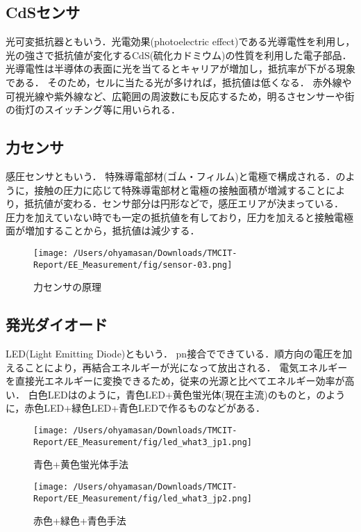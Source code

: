 \subsection{CdSセンサ\cite{dsfase}\cite{8347ty34i}\cite{B056}\cite{R300000001-I023994699-00}}
\label{CDSG}
光可変抵抗器ともいう．光電効果(photoelectric effect)である光導電性を利用し，光の強さで抵抗値が変化するCdS(硫化カドミウム)の性質を利用した電子部品．
光導電性は半導体の表面に光を当てるとキャリアが増加し，抵抗率が下がる現象である．
そのため，セルに当たる光が多ければ，抵抗値は低くなる．
赤外線や可視光線や紫外線など、広範囲の周波数にも反応するため，明るさセンサーや街の街灯のスイッチング等に用いられる．

\subsection{力センサ\cite{asdfsa}\cite{canon}}
\label{PG}
感圧センサともいう．
特殊導電部材(ゴム・フィルム)と電極で構成される．のように，接触の圧力に応じて特殊導電部材と電極の接触面積が増減することにより，抵抗値が変わる．センサ部分は円形などで，感圧エリアが決まっている．
圧力を加えていない時でも一定の抵抗値を有しており，圧力を加えると接触電極面が増加することから，抵抗値は減少する．

\begin{figure}[h]
\centering
\texttt{[image: /Users/ohyamasan/Downloads/TMCIT-Report/EE\_Measurement/fig/sensor-03.png]}
\caption{力センサの原理}
\label{fig:weight}
\end{figure}

\subsection{発光ダイオード\cite{dafadsav}\cite{gjkdgfbn}}
\label{LEDG}
LED(Light Emitting Diode)ともいう．
pn接合でできている．順方向の電圧を加えることにより，再結合エネルギーが光になって放出される．
電気エネルギーを直接光エネルギーに変換できるため，従来の光源と比べてエネルギー効率が高い．
白色LEDはのように，青色LED+黄色蛍光体(現在主流)のものと，のように，赤色LED+緑色LED+青色LEDで作るものなどがある．

\begin{figure}[h]
  \begin{minipage}[]{0.5\hsize}
    \centering
    \texttt{[image: /Users/ohyamasan/Downloads/TMCIT-Report/EE\_Measurement/fig/led\_what3\_jp1.png]}
    \caption{青色+黄色蛍光体手法}
    \label{fig:aokiro}
  \end{minipage}
  \begin{minipage}[]{0.5\hsize}
    \centering
    \texttt{[image: /Users/ohyamasan/Downloads/TMCIT-Report/EE\_Measurement/fig/led\_what3\_jp2.png]}
    \caption{赤色+緑色+青色手法}
    \label{fig:rgb}
  \end{minipage}
\end{figure}


